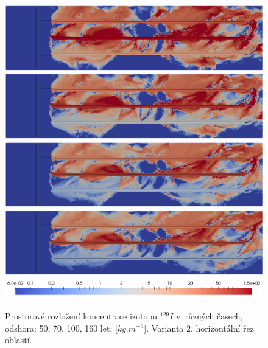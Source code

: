 \documentclass[11pt,a4paper]{article}
\begin{document}
\begin{onehalfspacing}
\begin{figure}[H]
\centering
\includegraphics[width=16cm]{graphics/obr_ralek/var2/050a.png}
\includegraphics[width=16cm]{graphics/obr_ralek/var2/070.png}
\includegraphics[width=16cm]{graphics/obr_ralek/var2/100a.png}
\includegraphics[width=16cm]{graphics/obr_ralek/var2/160a.png}
\includegraphics[width=16cm]{graphics/obr_ralek/var2/skala_var2.png}
\caption{Prostorové rozložení koncentrace izotopu $^{129}I$ v~různých časech, odshora: 50, 70, 100, 160 let; [$kg.m^{-3}$]. Varianta 2, horizontální řez oblastí.}
\end{figure}


\end{onehalfspacing}
\end{document}
